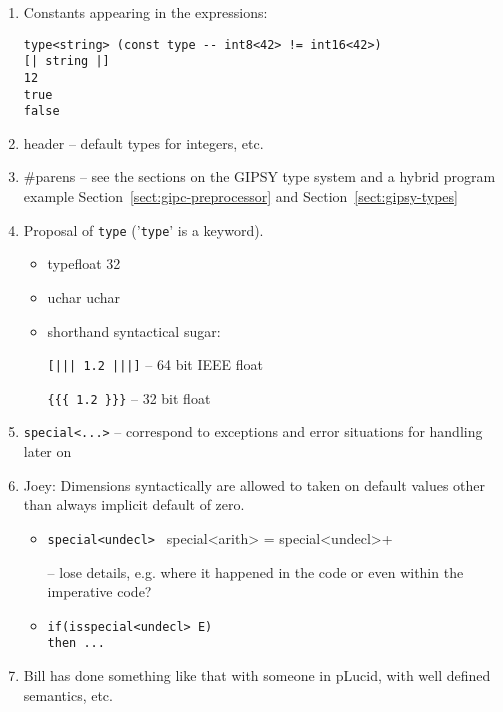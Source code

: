 \documentclass{easychair}
\newcommand{\xs}[1]{Section~\ref{#1}}
\newcommand{\api}[1]{\texttt{#1}\index{API!#1}}
\begin{document}
\begin{enumerate}

\item
Constants appearing in the expressions:

\begin{verbatim}
type<string> (const type -- int8<42> != int16<42>)
[| string |]
12
true
false
\end{verbatim}

\item
header -- default types for integers, etc.

\item
\#parens -- see the sections on the GIPSY
type system and a hybrid program example \xs{sect:gipc-preprocessor} and \xs{sect:gipsy-types}

\item
Proposal of \api{type} ('\api{type}' is a keyword).

\begin{itemize}
\item
typefloat 32
\item
uchar{{{ uchar}}}
\item shorthand syntactical sugar:

\verb+[||| 1.2 |||]+ -- 64 bit IEEE float

\verb+{{{ 1.2 }}}+ -- 32 bit float
\end{itemize}

\item
\verb+special<...>+ -- correspond to exceptions and
error situations for handling later on

\item
Joey: Dimensions syntactically are allowed to taken on default values
other than always implicit default of zero.

\begin{itemize}
\item
\verb+special<undecl> + special<arith> = special<undecl>+

 -- lose details, e.g. where it happened in the code
 or even within the imperative code?

\item
\begin{verbatim}
if(isspecial<undecl> E)
then ...
\end{verbatim}
\end{itemize}

\item
Bill has done something like that with someone in pLucid, with
well defined semantics, etc.


\end{enumerate}
\end{document}
